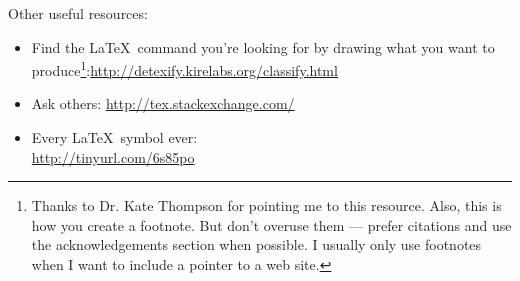 \noindent Other useful resources:
\begin{itemize}
\item Find the \LaTeX~command you're looking for by drawing what you
  want to produce\footnote{Thanks to Dr. Kate Thompson for pointing me
    to this resource. Also, this is how you create a footnote. But
    don't overuse them --- prefer citations and use the
    acknowledgements section when possible. I usually only use
    footnotes when I want to include a pointer to a web
    site.}:\url{http://detexify.kirelabs.org/classify.html}
\item Ask others: \url{http://tex.stackexchange.com/}
\item Every \LaTeX~symbol ever:\\ \url{http://tinyurl.com/6s85po}

\end{itemize}



